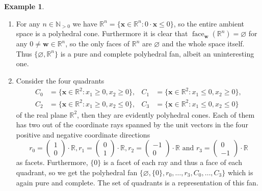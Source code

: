 \documentclass[
  paper=a4,
  titlepage,
  bibliography=totoc,
  pagesize=pdftex
]{scrartcl}
\numberwithin{figure}{section}
\numberwithin{equation}{section}
\numberwithin{table}{section}
\newcommand*\setR{\mathds{R}}
\newcommand*\setN{\mathds{N}}
\newcommand*\vectRR[2]{\begin{pmatrix} #1 \\ #2 \end{pmatrix}}
\let\vec\mathbf
\DeclareMathOperator{\face}{face}
\theoremstyle{definition}
\newtheorem{example}[definition]{Example}
\numberwithin{definition}{section}
\begin{document}
\begin{example}\
  \begin{enumerate}
    \item For any $n \in \setN_{>0}$ we have $\setR^n = \{ \vec x \in \setR^n : 0 \cdot
      \vec x \leq 0 \}$, so the entire ambient space is a polyhedral cone. Furthermore it
      is clear that $\face_{\vec w}(\setR^n) = \varnothing$ for any $0\neq\vec w \in
      \setR^n$, so the only faces of $\setR^n$ are $\varnothing$ and the whole space
      itself. Thus $\{ \varnothing, \setR^n\}$ is a pure and complete polyhedral fan,
      albeit an uninteresting one.
    \item Consider the four quadrants
      \begin{align*}
        C_0 &= \{ \vec x \in \setR^2 : x_1 \geq 0, x_2 \geq 0 \}, &
        C_1 &= \{ \vec x \in \setR^2 : x_1 \leq 0, x_2 \geq 0 \}, \\
        C_2 &= \{ \vec x \in \setR^2 : x_1 \geq 0, x_2 \leq 0 \}, &
        C_3 &= \{ \vec x \in \setR^2 : x_1 \leq 0, x_2 \leq 0 \}
      \end{align*}
      of the real plane $\setR^2$, then they are evidently polyhedral cones. Each of them
      has two out of the coordinate rays spanned by the unit vectors in the four positive
      and negative coordinate directions
      \[
        r_0 = \vectRR10 \cdot \setR,
        r_1 = \vectRR01 \cdot \setR,
        r_2 = \vectRR{-1}0 \cdot \setR
        \text{ and }
        r_3 = \vectRR0{-1} \cdot \setR
      \]
      as facets. Furthermore, $\{0\}$ is a facet of each ray and thus a face of each
      quadrant, so we get the polyhedral fan $\{ \varnothing, \{0\}, r_0, \dots, r_3, C_0,
      \dots, C_3 \}$ which is again pure and complete. The set of quadrants is a
      representation of this fan.
  \end{enumerate}
\end{example}
\end{document}
